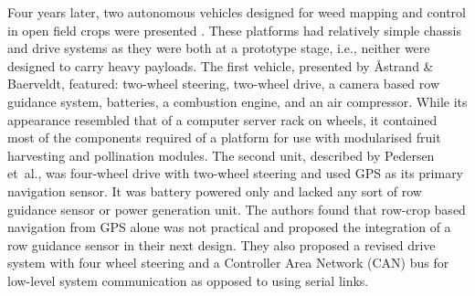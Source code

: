 \documentclass[preprint,authoryear,12pt]{elsarticle}
\begin{document}


        Four years later, two autonomous vehicles designed for weed mapping and control in open field crops were presented \citep{Pedersen2002,Astrand2002}.
        These platforms had relatively simple chassis and drive systems as they were both at a prototype stage, i.e., neither were designed to carry heavy payloads.
        The first vehicle, presented by Åstrand \& Baerveldt, featured: two-wheel steering, two-wheel drive, a camera based row guidance system, batteries, a combustion engine, and an air compressor.
        While its appearance resembled that of a computer server rack on wheels, it contained most of the components required of a platform for use with modularised fruit harvesting and pollination modules.
        The second unit, described by Pedersen et~al.\@, was four-wheel drive with two-wheel steering and used GPS as its primary navigation sensor.
        It was battery powered only and lacked any sort of row guidance sensor or power generation unit.
        The authors found that row-crop based navigation from GPS alone was not practical and proposed the integration of a row guidance sensor in their next design.
        They also proposed a revised drive system with four wheel steering and a Controller Area Network (CAN) bus for low-level system communication as opposed to using serial links.


\end{document}
